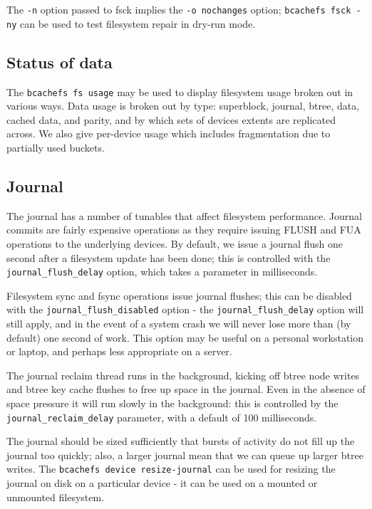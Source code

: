 \documentclass{article}
\begin{document}
The \texttt{-n} option passed to fsck implies the \texttt{-o nochanges} option;
\texttt{bcachefs fsck -ny} can be used to test filesystem repair in dry-run
mode.

\subsection{Status of data}

The \texttt{bcachefs fs usage} may be used to display filesystem usage broken
out in various ways. Data usage is broken out by type: superblock, journal,
btree, data, cached data, and parity, and by which sets of devices extents are
replicated across. We also give per-device usage which includes fragmentation
due to partially used buckets.

\subsection{Journal}

The journal has a number of tunables that affect filesystem performance. Journal
commits are fairly expensive operations as they require issuing FLUSH and FUA
operations to the underlying devices. By default, we issue a journal flush one
second after a filesystem update has been done; this is controlled with the
\texttt{journal\_flush\_delay} option, which takes a parameter in milliseconds.

Filesystem sync and fsync operations issue journal flushes; this can be disabled
with the \texttt{journal\_flush\_disabled} option - the
\texttt{journal\_flush\_delay} option will still apply, and in the event of a
system crash we will never lose more than (by default) one second of work. This
option may be useful on a personal workstation or laptop, and perhaps less
appropriate on a server.

The journal reclaim thread runs in the background, kicking off btree node writes
and btree key cache flushes to free up space in the journal. Even in the absence
of space pressure it will run slowly in the background: this is controlled by
the \texttt{journal\_reclaim\_delay} parameter, with a default of 100
milliseconds.

The journal should be sized sufficiently that bursts of activity do not fill up
the journal too quickly; also, a larger journal mean that we can queue up larger
btree writes. The \texttt{bcachefs device resize-journal} can be used for
resizing the journal on disk on a particular device - it can be used on a
mounted or unmounted filesystem.
\end{document}
